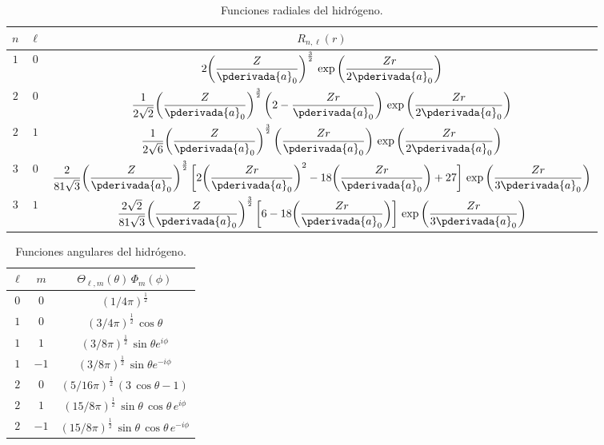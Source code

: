 \begin{table}[H]
\centering
\large
\renewcommand{\arraystretch}{1.5}
\begin{tabular}{|c | c | c|} \hline
$n$ & $\ell$ & $R_{n, \ell} (r)$ \\ \hline
$1$ & $0$ & $2 \bigg( \dfrac{Z}{\pderivada{a}_{0}} \bigg)^{\frac{3}{2}} \, \exp\bigg( \dfrac{Z r}{2 \pderivada{a}_{0}} \bigg)$ \\ \hline
$2$ & $0$ & $\dfrac{1}{2 \sqrt{2}} \bigg( \dfrac{Z}{\pderivada{a}_{0}} \bigg)^{\frac{3}{2}} \, \bigg( 2 - \dfrac{Z r}{\pderivada{a}_{0}} \bigg) \, \exp\bigg( \dfrac{Z r}{2 \pderivada{a}_{0}} \bigg)$ \\ \hline
$2$ & $1$ & $\dfrac{1}{2 \sqrt{6}} \bigg( \dfrac{Z}{\pderivada{a}_{0}} \bigg)^{\frac{3}{2}} \, \bigg( \dfrac{Z r}{\pderivada{a}_{0}} \bigg) \, \exp\bigg( \dfrac{Z r}{2 \pderivada{a}_{0}} \bigg)$ \\ \hline
$3$ & $0$ & $\dfrac{2}{81 \sqrt{3}} \bigg( \dfrac{Z}{\pderivada{a}_{0}} \bigg)^{\frac{3}{2}} \, \bigg[ 2 \bigg( \dfrac{Z r}{\pderivada{a}_{0}} \bigg)^{2} - 18 \bigg( \dfrac{Z r}{\pderivada{a}_{0}} \bigg) + 27 \bigg] \, \exp\bigg( \dfrac{Z r}{3\pderivada{a}_{0}} \bigg)$ \\ \hline
$3$ & $1$ & $\dfrac{2 \sqrt{2}}{81 \sqrt{3}} \bigg( \dfrac{Z}{\pderivada{a}_{0}} \bigg)^{\frac{3}{2}} \, \bigg[ 6 - 18 \bigg( \dfrac{Z r}{\pderivada{a}_{0}} \bigg) \bigg] \, \exp\bigg( \dfrac{Z r}{3\pderivada{a}_{0}} \bigg)$ \\ \hline
\end{tabular}
\caption{Funciones radiales del hidrógeno.}
\label{table:Tabla_funciones_radiales}
\end{table}

\begin{table}[H]
\centering
\large
\renewcommand{\arraystretch}{1.5}
\begin{tabular}{|c | c | c|} \hline
$\ell$ & $m$ & $\Theta_{\ell, m} (\theta) \, \Phi_{m} (\phi)$ \\ \hline
$0$ & $0$ & $(1/4 \pi)^{\frac{1}{2}}$ \\ \hline
$1$ & $0$ & $(3/4 \pi)^{\frac{1}{2}} \, \cos \theta$ \\ \hline
$1$ & $1$ & $(3/8 \pi)^{\frac{1}{2}} \, \sin \theta e^{i \phi}$ \\ \hline
$1$ & $-1$ & $(3/8 \pi)^{\frac{1}{2}} \, \sin \theta e^{-i \phi}$ \\ \hline
$2$ & $0$ & $(5/16 \pi)^{\frac{1}{2}} \, (3 \, \cos \theta - 1)$ \\ \hline
$2$ & $1$ & $(15/8 \pi)^{\frac{1}{2}} \, \sin \theta \, \cos \theta \, e^{i \phi}$ \\ \hline
$2$ & $-1$ & $(15/8 \pi)^{\frac{1}{2}} \, \sin \theta \, \cos \theta \, e^{-i \phi}$ \\ \hline
\end{tabular}
\caption{Funciones angulares del hidrógeno.}
\label{table:Tabla_funciones_angulares}
\end{table}

